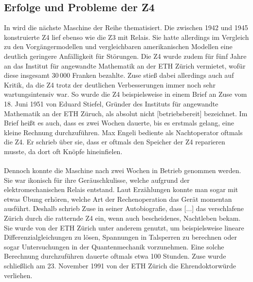 \subsection{Erfolge und Probleme der Z4}
In \cite{bruderer2011konrad} wird die nächste Maschine der Reihe thematisiert. Die zwischen 1942 und 1945 konstruierte Z4 lief ebenso wie die Z3 mit Relais. Sie hatte allerdings im Vergleich zu den Vorgängermodellen und vergleichbaren amerikanischen Modellen eine deutlich geringere Anfälligkeit für Störungen. Die Z4 wurde zudem für fünf Jahre an das Institut für angewandte Mathematik an der ETH Zürich vermietet, wofür diese insgesamt $30\,000$ Franken bezahlte. Zuse stieß dabei allerdings auch auf Kritik, da die Z4 trotz der deutlichen Verbesserungen immer noch sehr wartungsintensiv war. So wurde die Z4 beispielsweise in einem Brief an Zuse vom 18. Juni 1951 von Eduard Stiefel, Gründer des Instituts für angewandte Mathematik an der ETH Züruch, als \glqq{}absolut nicht [betriebsbereit]\grqq{} bezeichnet. Im Brief heißt es auch, dass es zwei Wochen dauerte, bis es erstmals gelang, eine kleine Rechnung durchzuführen. Max Engeli bediente als Nachtoperator oftmals die Z4. Er schrieb über sie, dass er oftmals den Speicher der Z4 reparieren musste, da dort oft Knöpfe hineinfielen.\\\\
Dennoch konnte die Maschine nach zwei Wochen in Betrieb genommen werden. Sie war ikonisch für ihre Geräuschkulisse, welche aufgrund der elektromechanischen Relais entstand. Laut Erzählungen konnte man sogar mit etwas Übung erhören, welche Art der Rechenoperation das Gerät momentan ausführt. Deshalb schrieb Zuse in seiner Autobiografie, dass \glqq{}[...] das verschlafene Zürich durch die ratternde Z4 ein, wenn auch bescheidenes, Nachtleben\grqq{} bekam. Sie wurde von der ETH Zürich unter anderem genutzt, um beispielsweise lineare Differenzialgleichungen zu lösen, Spannungen in Talsperren zu berechnen oder sogar Untersuchungen in der Quantenmechanik vorzunehmen. Eine solche Berechnung durchzuführen dauerte oftmals etwa 100 Stunden. Zuse wurde schließlich am 23. November 1991 von der ETH Zürich die Ehrendoktorwürde verliehen.
